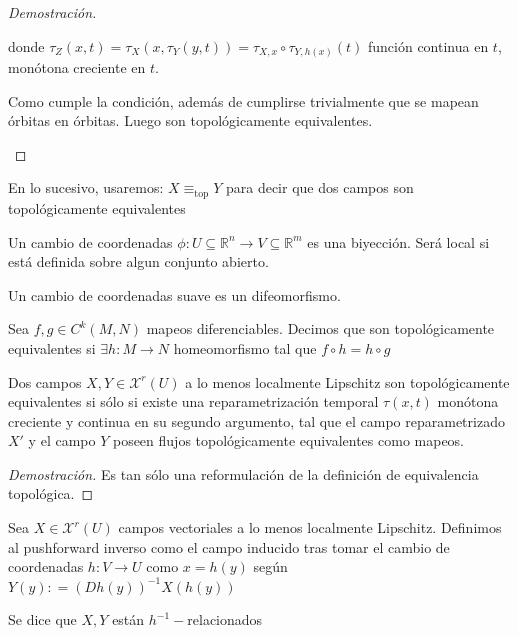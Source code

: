 \begin{proof}[Demostración]
\begin{enumerate}
		donde $\tau_Z(x,t) = \tau_{X}(x,\tau_{Y}(y,t) ) = \tau_{X,x}\circ \tau_{ Y,h(x) } (t)$ función continua en $t$, monótona creciente en $t$.	
		
		Como cumple la condición,  además de cumplirse trivialmente que se mapean órbitas en órbitas. Luego son topológicamente equivalentes.
		
	\end{enumerate}
\end{proof}

\begin{notn}
	En lo sucesivo, usaremos: $X\equiv_{\text{top}} Y$ para decir que dos campos son topológicamente equivalentes
\end{notn}

\begin{defn}
	Un cambio de coordenadas $\phi :U \subseteq \mathbb{R}^n \to V \subseteq\mathbb{R}^m$ es una biyección. Será local si está definida sobre algun conjunto abierto. 
	
	Un cambio de coordenadas suave es un difeomorfismo. 
\end{defn}

\begin{defn}
	Sea $f,g \in C^k(M,N)$ mapeos diferenciables. Decimos que son topológicamente equivalentes si $\exists h: M\to N$ homeomorfismo tal que $f \circ h = h \circ g$
\end{defn}

\begin{prop}
	Dos campos $X,Y\in \mathcal{X}^r(U)$ a lo menos localmente Lipschitz son topológicamente equivalentes si sólo si existe una reparametrización temporal $\tau(x,t)$ monótona creciente y continua en su segundo argumento, tal que el campo reparametrizado $X'$ y el campo $Y$ poseen flujos topológicamente equivalentes como mapeos.
\end{prop}

\begin{proof}[Demostración]
	Es tan sólo una reformulación de la definición de equivalencia topológica.
\end{proof}

\begin{defn}
	Sea $X\in \mathcal{X}^r(U)$ campos vectoriales a lo menos localmente Lipschitz. Definimos al pushforward inverso como el campo inducido tras tomar el cambio de coordenadas $h:V\to U$ como $x = h(y)$ según $Y(y) : = (Dh(y))^{-1} X(h(y))$
	
	Se dice que $X,Y$ están $h^{-1}-$relacionados
\end{defn}

